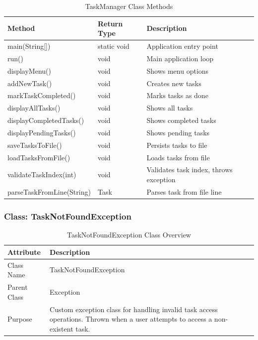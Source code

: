 \documentclass[12pt,a4paper]{article}
\begin{document}
\begin{table}[H]
\centering
\begin{tabular}{|l|l|p{6cm}|}
\hline
\textbf{Method} & \textbf{Return Type} & \textbf{Description} \\
\hline
main(String[]) & static void & Application entry point \\
\hline
run() & void & Main application loop \\
\hline
displayMenu() & void & Shows menu options \\
\hline
addNewTask() & void & Creates new tasks \\
\hline
markTaskCompleted() & void & Marks tasks as done \\
\hline
displayAllTasks() & void & Shows all tasks \\
\hline
displayCompletedTasks() & void & Shows completed tasks \\
\hline
displayPendingTasks() & void & Shows pending tasks \\
\hline
saveTasksToFile() & void & Persists tasks to file \\
\hline
loadTasksFromFile() & void & Loads tasks from file \\
\hline
validateTaskIndex(int) & void & Validates task index, throws exception \\
\hline
parseTaskFromLine(String) & Task & Parses task from file line \\
\hline
\end{tabular}
\caption{TaskManager Class Methods}
\end{table}

\subsubsection{Class: TaskNotFoundException}

\begin{table}[H]
\centering
\begin{tabular}{|l|p{10cm}|}
\hline
\textbf{Attribute} & \textbf{Description} \\
\hline
Class Name & TaskNotFoundException \\
\hline
Parent Class & Exception \\
\hline
Purpose & Custom exception class for handling invalid task access operations. Thrown when a user attempts to access a non-existent task. \\
\hline
\end{tabular}
\caption{TaskNotFoundException Class Overview}
\end{table}
\end{document}

